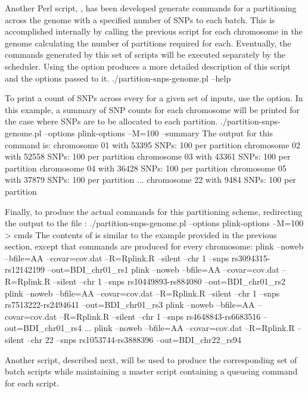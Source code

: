 
\startsubsubject[title={Partitioning SNP indicies across the genome}]

Another Perl script,
,
has been developed generate \PLINK commands for a partitioning across the genome
with a specified number of SNPs to each batch.
This is accomplished internally by calling the previous script
 for each chromosome
in the genome calculating the number of partitions required for each.
Eventually, the commands generated by this set of scripts
will be executed separately by the scheduler.
%
Using the  option produces a more detailed description of this
script and the options passed to it.
\startSTDIN
./partition-snps-genome.pl --help
\stopSTDIN

To print a count of SNPs across every for a given set of inputs, use the  option.
In this example, a summary of SNP counts for each chromosome will be printed for the case where
 SNPs are to be allocated to each partition.
\startSTDIN
./partition-snps-genome.pl --options plink-options --M=100 --summary
\stopSTDIN
The output for this command is:
\startSTDOUT
chromosome 01 with 53395 SNPs:   100 per partition 
chromosome 02 with 52558 SNPs:   100 per partition 
chromosome 03 with 43361 SNPs:   100 per partition 
chromosome 04 with 36428 SNPs:   100 per partition 
chromosome 05 with 37879 SNPs:   100 per partition 
...
chromosome 22 with  9484 SNPs:   100 per partition 
\stopSTDOUT

Finally, to produce the actual \PLINK commands for this partitioning scheme,
redirecting the output to the file :
\startSTDIN
./partition-snps-genome.pl --options plink-options --M=100 > cmds
\stopSTDIN
The contents of  is similar to the example provided in the previous section,
except that \PLINK commands are produced for every chromosome:
\startSTDOUT
plink --noweb  --bfile=AA --covar=cov.dat --R=Rplink.R --silent --chr 1 --snps rs3094315-rs12142199 --out=BDI_chr01_rs1
plink --noweb  --bfile=AA --covar=cov.dat --R=Rplink.R --silent --chr 1 --snps rs10449893-rs884080 --out=BDI_chr01_rs2
plink --noweb  --bfile=AA --covar=cov.dat --R=Rplink.R --silent --chr 1 --snps rs7513222-rs2494641 --out=BDI_chr01_rs3
plink --noweb  --bfile=AA --covar=cov.dat --R=Rplink.R --silent --chr 1 --snps rs4648843-rs6683516 --out=BDI_chr01_rs4
...
plink --noweb  --bfile=AA --covar=cov.dat --R=Rplink.R --silent --chr 22 --snps rs1053744-rs3888396 --out=BDI_chr22_rs94
\stopSTDOUT

Another script, described next, will be used to produce the corresponding set of batch scripts while
maintaining a master script containing a queueing command for each script.

\stopsubsubject

\endinput
